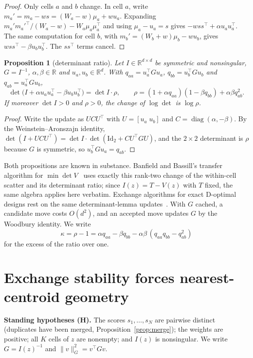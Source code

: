 \documentclass[11pt]{amsart}
\newtheorem{proposition}[theorem]{Proposition}
\theoremstyle{definition}
\theoremstyle{remark}
\newcommand{\R}{\mathbb{R}}
\newcommand{\T}{^{\top}}
\newcommand{\Ib}{I(z)}
\begin{document}
\begin{proof}
Only cells $a$ and $b$ change. In cell $a$, write $m_a'=m_a-ws=(W_a-w)\mu_a+wu_a$. Expanding
$m_a'm_a'^{\top}/(W_a-w)-W_a\mu_a\mu_a\T$ and using $\mu_a-u_a=s$ gives
$-wss\T+\alpha u_au_a\T$. The same computation for cell $b$, with $m_b'=(W_b+w)\mu_b-wu_b$,
gives $wss\T-\beta u_bu_b\T$. The $ss\T$ terms cancel.
\end{proof}

\begin{proposition}[determinant ratio]\label{prop:detratio}
Let $I\in\R^{d\times d}$ be symmetric and nonsingular, $G=I^{-1}$, $\alpha,\beta\in\R$ and
$u_a,u_b\in\R^d$. With $q_{aa}=u_a\T Gu_a$, $q_{bb}=u_b\T Gu_b$ and $q_{ab}=u_a\T Gu_b$,
\begin{equation}\label{eq:ratio}
\det\bigl(I+\alpha u_au_a\T-\beta u_bu_b\T\bigr)=\det I\cdot\rho,\qquad
\rho=(1+\alpha q_{aa})(1-\beta q_{bb})+\alpha\beta q_{ab}^2 .
\end{equation}
If moreover $\det I>0$ and $\rho>0$, the change of $\log\det$ is $\log\rho$.
\end{proposition}

\begin{proof}
Write the update as $UCU\T$ with $U=[u_a\;u_b]$ and $C=\operatorname{diag}(\alpha,-\beta)$. By
the Weinstein--Aronszajn identity, $\det(I+UCU\T)=\det I\cdot\det(\mathrm{Id}_2+CU\T GU)$, and the
$2\times2$ determinant is $\rho$ because $G$ is symmetric, so $u_b\T Gu_a=q_{ab}$.
\end{proof}

Both propositions are known in substance. Banfield and Bassill's transfer algorithm for
$\min\det V$~\cite{banfield1977} uses exactly this rank-two change of the within-cell scatter
and its determinant ratio; since $\Ib=T-V(z)$ with $T$ fixed, the same algebra applies here
verbatim. Exchange algorithms for exact D-optimal designs rest on the same determinant-lemma
updates~\cite{fedorov1972,mitchell1974,cook1980}. With $G$ cached, a candidate move costs $O(d^2)$,
and an accepted move updates $G$ by the Woodbury identity. We write
\[
\kappa=\rho-1=\alpha q_{aa}-\beta q_{bb}-\alpha\beta\,(q_{aa}q_{bb}-q_{ab}^2)
\]
for the excess of the ratio over one.

\section{Exchange stability forces nearest-centroid geometry}\label{sec:main}

\noindent\textbf{Standing hypotheses (H).} The scores $s_1,\dots,s_N$ are pairwise distinct
(duplicates have been merged, Proposition~\ref{prop:merge}); the weights are positive; all $K$
cells of $z$ are nonempty; and $\Ib$ is nonsingular. We write $G=\Ib^{-1}$ and
$\|v\|_G^2=v\T Gv$.
\end{document}
